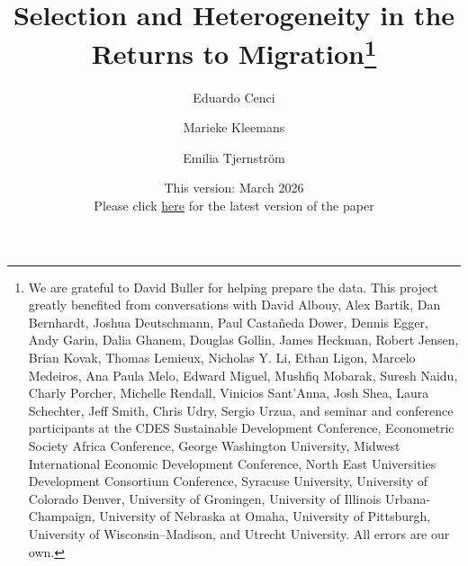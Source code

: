 \documentclass[12pt]{article}
\begin{document}
\begin{titlepage}

\title{Selection and Heterogeneity in the Returns to Migration\footnote{%
We are grateful to David Buller for helping prepare the data. This project greatly benefited from conversations with David Albouy, Alex Bartik, Dan Bernhardt, Joshua Deutschmann, Paul Castañeda Dower, Dennis Egger, Andy Garin, Dalia Ghanem, Douglas Gollin, James Heckman, Robert Jensen, Brian Kovak, Thomas Lemieux, Nicholas Y. Li, Ethan Ligon, Marcelo Medeiros, Ana Paula Melo, Edward Miguel, Mushfiq Mobarak, Suresh Naidu, Charly Porcher, Michelle Rendall, Vinicios Sant'Anna, Josh Shea, Laura Schechter, Jeff Smith, Chris Udry, Sergio Urzua, and seminar and conference participants at the CDES Sustainable Development Conference, Econometric Society Africa Conference, George Washington University, Midwest International Economic Development Conference, North East Universities Development Consortium Conference, Syracuse University, University of Colorado Denver, University of Groningen, University of Illinois Urbana-Champaign, University of Nebraska at Omaha, University of Pittsburgh, University of Wisconsin–Madison, and Utrecht University. All errors are our own.}}
\author{
  Eduardo Cenci 
  \and
  Marieke Kleemans
  \and
  Emilia Tjernstr\"{o}m
}
{\small \centering \date{This version: March 2026 \\ 
Please click  \href{https://www.econometricsociety.org/event_papers/view/265/450}{here} for the latest version of the paper}}

\clearpage\maketitle
\vspace{-0.4cm}
\thispagestyle{empty}


\end{titlepage}
\end{document}
